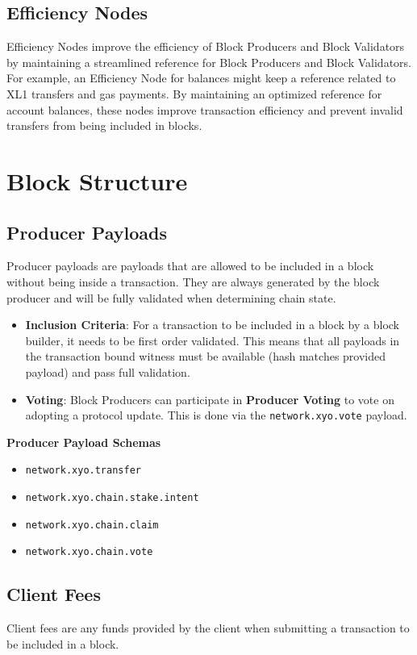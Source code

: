 \documentclass{article}
\begin{document}
\subsection{Efficiency Nodes}
Efficiency Nodes improve the efficiency of Block Producers and Block Validators
by maintaining a streamlined reference for Block Producers and Block
Validators. For example, an Efficiency Node for balances might keep a reference
related to XL1 transfers and gas payments. By maintaining an optimized
reference for account balances, these nodes improve transaction efficiency and
prevent invalid transfers from being included in blocks.

\section{Block Structure}

\subsection{Producer Payloads}
Producer payloads are payloads that are allowed to be included in a block
without being inside a transaction. They are always generated by the block
producer and will be fully validated when determining chain state.

\begin{itemize}
    \item \textbf{Inclusion Criteria}: For a transaction to be included in a block by a block builder, it needs to be first order validated. This means that all payloads in the transaction bound witness must be available (hash matches provided payload) and pass full validation.
    \item \textbf{Voting}: Block Producers can participate in \textbf{Producer Voting} to vote on adopting a protocol update. This is done via the \texttt{network.xyo.vote} payload.
\end{itemize}
\textbf{Producer Payload Schemas}
\begin{itemize}
    \item \texttt{network.xyo.transfer}
    \item \texttt{network.xyo.chain.stake.intent}
    \item \texttt{network.xyo.chain.claim}
    \item \texttt{network.xyo.chain.vote}
\end{itemize}

\subsection{Client Fees}
Client fees are any funds provided by the client when submitting a transaction
to be included in a block.
\end{document}
